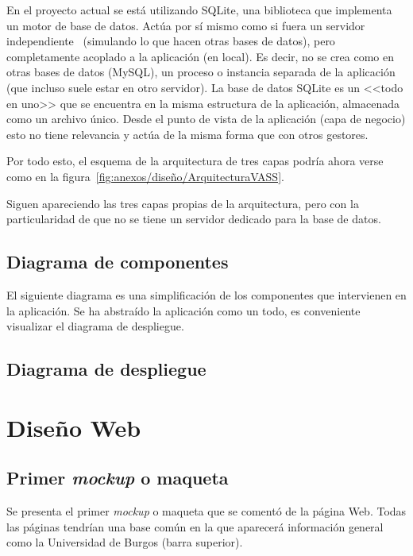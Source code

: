 En el proyecto actual se está utilizando SQLite, una biblioteca que implementa
un motor de base de datos. Actúa por sí mismo como si fuera un servidor
independiente~\cite{sqlite} (simulando lo que hacen otras bases de datos), pero
completamente acoplado a la aplicación (en local). Es decir, no se crea como en
otras bases de datos (MySQL), un proceso o instancia separada de la aplicación
(que incluso suele estar en otro servidor). La base de datos SQLite es un <<todo
en uno>> que se encuentra en la misma estructura de la aplicación, almacenada
como un archivo único. Desde el punto de vista de la aplicación (capa de
negocio) esto no tiene relevancia y actúa de la misma forma que con otros
gestores.

Por todo esto, el esquema de la arquitectura de tres capas podría ahora verse
como en la figura~\ref{fig:anexos/diseño/ArquitecturaVASS}.


Siguen apareciendo las tres capas propias de la arquitectura, pero con la
particularidad de que no se tiene un servidor dedicado para la base de datos.

\clearpage
\subsection{Diagrama de componentes}
El siguiente diagrama es una simplificación de los componentes que intervienen
en la aplicación. Se ha abstraído la aplicación como un todo, es conveniente
visualizar el diagrama de despliegue.

\subsection{Diagrama de despliegue}


\section{Diseño Web}

\subsection{Primer \textit{mockup} o maqueta} 

Se presenta el primer \textit{mockup} o maqueta que se comentó de la página Web.
Todas las páginas tendrían una base común en la que aparecerá información
general como la Universidad de Burgos (barra superior).

